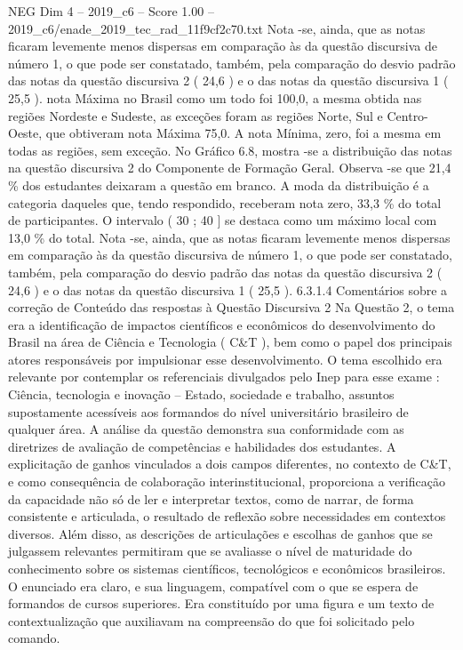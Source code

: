 \begin{textsample}{NEG Dim 4 – 2019\_c6 – Score 1.00 – 2019\_c6/enade\_2019\_tec\_rad\_11f9cf2c70.txt}
Nota -se, ainda, que as notas ficaram levemente menos dispersas em comparação às da questão discursiva de número 1, o que pode ser constatado, também, pela comparação do desvio padrão das notas da questão discursiva 2 ( 24,6 ) e o das notas da questão discursiva 1 ( 25,5 ). nota Máxima no Brasil como um todo foi 100,0, a mesma obtida nas regiões Nordeste e Sudeste, as exceções foram as regiões Norte, Sul e Centro-Oeste, que obtiveram nota Máxima 75,0.
A nota Mínima, zero, foi a mesma em todas as regiões, sem exceção.
No Gráfico 6.8, mostra -se a distribuição das notas na questão discursiva 2 do Componente de Formação Geral.
Observa -se que 21,4 \% dos estudantes deixaram a questão em branco.
A moda da distribuição é a categoria daqueles que, tendo respondido, receberam nota zero, 33,3 \% do total de participantes.
O intervalo ( 30 ; 40 ] se destaca como um máximo local com 13,0 \% do total.
Nota -se, ainda, que as notas ficaram levemente menos dispersas em comparação às da questão discursiva de número 1, o que pode ser constatado, também, pela comparação do desvio padrão das notas da questão discursiva 2 ( 24,6 ) e o das notas da questão discursiva 1 ( 25,5 ). 6.3.1.4 Comentários sobre a correção de Conteúdo das respostas à Questão Discursiva 2 Na Questão 2, o tema era a identificação de impactos científicos e econômicos do desenvolvimento do Brasil na área de Ciência e Tecnologia ( C\&T ), bem como o papel dos principais atores responsáveis por impulsionar esse desenvolvimento.
O tema escolhido era relevante por contemplar os referenciais divulgados pelo Inep para esse exame : Ciência, tecnologia e inovação – Estado, sociedade e trabalho, assuntos supostamente acessíveis aos formandos do nível universitário brasileiro de qualquer área.
A análise da questão demonstra sua conformidade com as diretrizes de avaliação de competências e habilidades dos estudantes.
A explicitação de ganhos vinculados a dois campos diferentes, no contexto de C\&T, e como consequência de colaboração interinstitucional, proporciona a verificação da capacidade não só de ler e interpretar textos, como de narrar, de forma consistente e articulada, o resultado de reflexão sobre necessidades em contextos diversos.
Além disso, as descrições de articulações e escolhas de ganhos que se julgassem relevantes permitiram que se avaliasse o nível de maturidade do conhecimento sobre os sistemas científicos, tecnológicos e econômicos brasileiros.
O enunciado era claro, e sua linguagem, compatível com o que se espera de formandos de cursos superiores.
Era constituído por uma figura e um texto de contextualização que auxiliavam na compreensão do que foi solicitado pelo comando.

\end{textsample}
